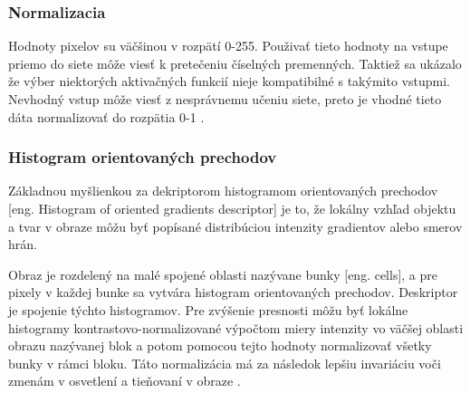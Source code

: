 \subsubsection{Normalizacia}
Hodnoty pixelov su väčšinou v rozpätí 0-255. Použivať tieto hodnoty na vstupe priemo do siete môže viesť k pretečeniu číselných premenných.
Taktiež sa ukázalo že výber niektorých aktivačných funkcií nieje kompatibilné s takýmito vstupmi.
Nevhodný vstup môže viesť z nesprávnemu učeniu siete, preto je vhodné tieto dáta normalizovať do rozpätia 0-1 \cite{odkaz:PreprocessingNormalization}.

\subsubsection{Histogram orientovaných prechodov}
Základnou myšlienkou za dekriptorom histogramom orientovaných prechodov [eng. Histogram of oriented gradients descriptor] je to, že lokálny vzhľad objektu a tvar v obraze môžu byť popísané
	distribúciou intenzity gradientov alebo smerov hrán.

Obraz je rozdelený na malé spojené oblasti nazývane bunky [eng. cells], a pre pixely v každej bunke sa vytvára histogram orientovaných prechodov.
Deskriptor je spojenie týchto histogramov.
Pre zvýšenie presnosti môžu byť lokálne histogramy kontrastovo-normalizované výpočtom miery intenzity vo väčšej oblasti obrazu nazývanej blok a potom
	pomocou tejto hodnoty normalizovať všetky bunky v rámci bloku.
Táto normalizácia má za následok lepšiu invariáciu voči zmenám v osvetlení a tieňovaní v obraze \cite{prop:HOG}.

\begin{comment}
	\subsubsection{Priemerna štandartná odchylka vstupných údajov}
	Je užitočné vytvoriť si tzv. ''stredný obraz'' získaný priemernými hodnotami pre každý pixel zo všetkých trénovacích dát.
	Timto spôsobom je možné vytvoriť si základny prehľad o štruktúre vstupných dát.
	Na základe toho môžeme potom do vstupným dát pridať rôzne dalšie variácie klasifikovaných objektov pre lepšie generalizovanie klasifikátora \cite{odkaz:NNPreprocessing}.
\end{comment}
